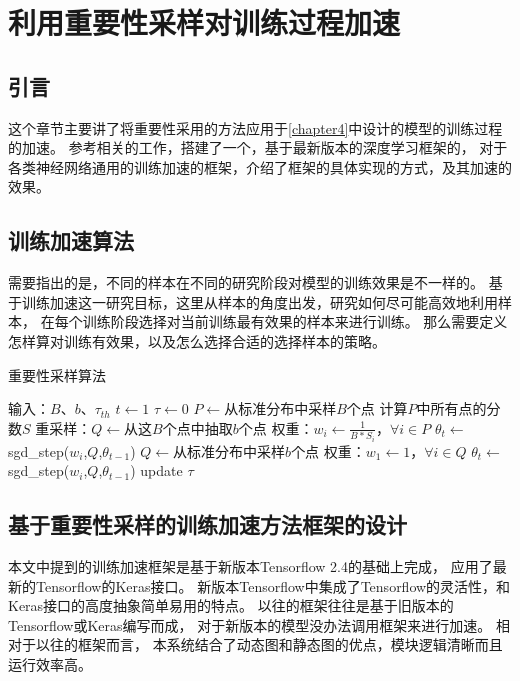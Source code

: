 
\chapter{利用重要性采样对训练过程加速}\label{chapter5}
\section{引言}
这个章节主要讲了将重要性采用的方法应用于\ref{chapter4}中设计的模型的训练过程的加速。
参考相关的工作，搭建了一个，基于最新版本的深度学习框架的，
对于各类神经网络通用的训练加速的框架，介绍了框架的具体实现的方式，及其加速的效果。

\section{训练加速算法}
需要指出的是，不同的样本在不同的研究阶段对模型的训练效果是不一样的。
基于训练加速这一研究目标，这里从样本的角度出发，研究如何尽可能高效地利用样本，
在每个训练阶段选择对当前训练最有效果的样本来进行训练。
那么需要定义怎样算对训练有效果，以及怎么选择合适的选择样本的策略。

\begin{algorithm}
  \caption{重要性采样算法}
  \begin{algorithmic}
    \STATE 输入：$B$、$b$、$\tau_{th}$
    \STATE $t \gets 1$
    \STATE $\tau \gets 0$
    \REPEAT
        \STATE $P \gets$从标准分布中采样$B$个点
        \STATE 计算$P$中所有点的分数$S$
        \STATE 重采样：$Q \gets$从这$B$个点中抽取$b$个点
        \STATE 权重：$w_i \gets \frac{1}{B*S_i}$，$\forall i \in P$
        \STATE $\theta_t \gets $sgd\_step($w_i$,$Q$,$\theta_{t-1}$)
      \ELSE
        \STATE $Q \gets$从标准分布中采样$b$个点
        \STATE 权重：$w_1 \gets 1$，$\forall i \in Q$
        \STATE $\theta_t \gets $sgd\_step($w_i$,$Q$,$\theta_{t-1}$)
      \ENDIF
      \STATE update $\tau$
  \end{algorithmic}
\end{algorithm}

\section{基于重要性采样的训练加速方法框架的设计}
本文中提到的训练加速框架是基于新版本Tensorflow 2.4的基础上完成，
应用了最新的Tensorflow的Keras接口。
新版本Tensorflow中集成了Tensorflow的灵活性，和Keras接口的高度抽象简单易用的特点。
以往的框架往往是基于旧版本的Tensorflow或Keras编写而成，
对于新版本的模型没办法调用框架来进行加速。
相对于以往的框架而言，
本系统结合了动态图和静态图的优点，模块逻辑清晰而且运行效率高。

